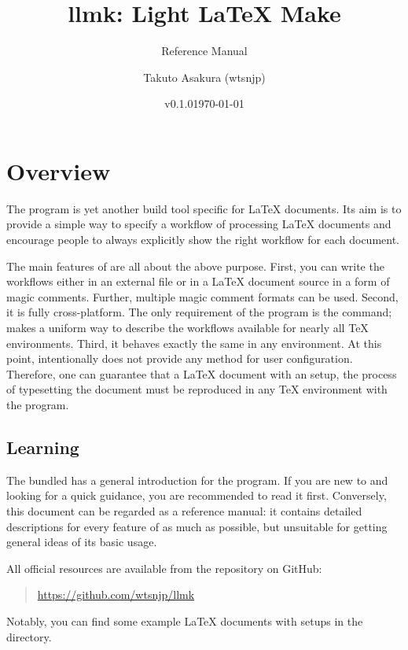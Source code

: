 \documentclass[draft]{llmk-doc}
\title{llmk: Light {\LaTeX} Make}
\author{Takuto Asakura (wtsnjp)}
\subtitle{Reference Manual}
\date{v0.1.0\quad\today}
\begin{document}
\maketitle

\section{Overview}

The  program is yet another build tool specific for {\LaTeX}
documents. Its aim is to provide a simple way to specify a workflow of
processing {\LaTeX} documents and encourage people to always explicitly show
the right workflow for each document.

The main features of  are all about the above purpose. First, you
can write the workflows either in an external file  or in a
{\LaTeX} document source in a form of magic comments. Further, multiple magic
comment formats can be used. Second, it is fully cross-platform. The only
requirement of the program is the  command;  makes a
uniform way to describe the workflows available for nearly all {\TeX}
environments. Third, it behaves exactly the same in any environment. At this
point,  intentionally does not provide any method for user
configuration. Therefore, one can guarantee that a {\LaTeX} document with an
 setup, the process of typesetting the document must be reproduced
in any {\TeX} environment with the program.


\subsection{Learning }

The bundled \href{https://github.com/wtsnjp/llmk/blob/master/README.md}
{} has a general introduction for the program. If you are new
to  and looking for a quick guidance, you are recommended to read it
first. Conversely, this document can be regarded as a reference manual: it
contains detailed descriptions for every feature of  as much as
possible, but unsuitable for getting general ideas of its basic usage.

\begin{samepage}
All official resources are available from the repository on GitHub:
%
\begin{quote}
\url{https://github.com/wtsnjp/llmk}
\end{quote}
%
Notably, you can find some example {\LaTeX} documents with  setups
in the \href{https://github.com/wtsnjp/llmk/tree/master/examples}
{} directory.
\end{samepage}
\end{document}
